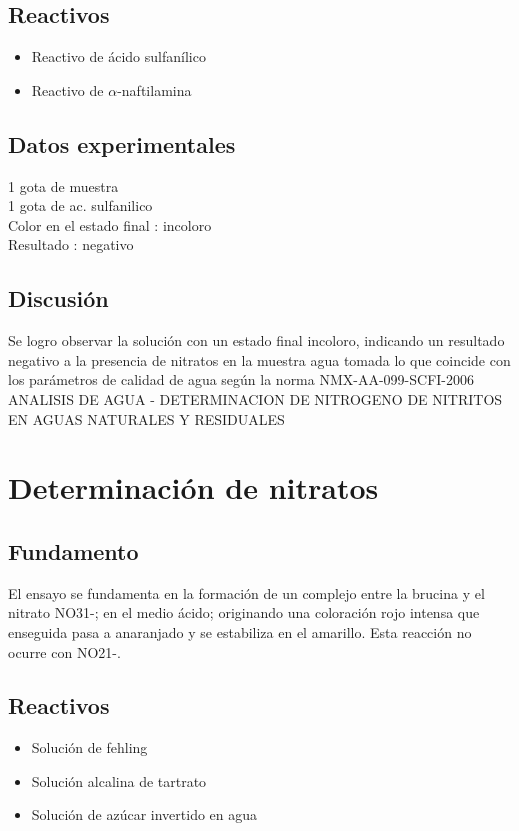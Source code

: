 \documentclass[a4paper,12pt]{article} %
\begin{document}
\subsection{Reactivos} 
\begin{itemize}
    \item{Reactivo de ácido sulfanílico} 
    \item{Reactivo de $\alpha$-naftilamina}
\end{itemize}

\subsection{Datos experimentales}
1 gota de muestra \\
1 gota de ac. sulfanilico \\
Color en el estado final : incoloro \\
Resultado : negativo \\

\subsection{Discusión}
Se logro observar la solución con un estado final incoloro, indicando un resultado negativo a la presencia de nitratos en la muestra agua tomada lo que coincide con los parámetros de calidad de agua según la norma NMX-AA-099-SCFI-2006 ANALISIS DE AGUA - DETERMINACION DE NITROGENO DE NITRITOS EN AGUAS NATURALES Y RESIDUALES



\newpage

\section{Determinación de nitratos}

\subsection{Fundamento} 
El ensayo se fundamenta en la formación de un complejo entre la brucina y el nitrato NO31-; en el medio ácido; originando una coloración rojo intensa que enseguida pasa a anaranjado y se estabiliza en el amarillo. Esta reacción no ocurre con NO21-. 

\subsection{Reactivos} 
\begin{itemize}
    \item{Solución de fehling} 
    \item{Solución alcalina de tartrato}
    \item{Solución de azúcar invertido en agua}
\end{itemize}
\end{document}
